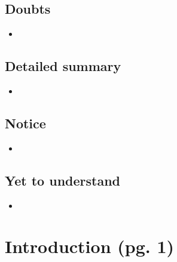 \documentclass{article}
\begin{document}
\subsection{Doubts}

    \begin{itemize}

    \item 
    
    \end{itemize}

\subsection{Detailed summary}

    \begin{itemize}

    \item 
    
    \end{itemize}

\subsection{Notice}

    \begin{itemize}

    \item 
    
    \end{itemize}

\subsection{Yet to understand}

    \begin{itemize}

    \item 
    
    \end{itemize}

\section{Introduction (pg. 1)}
\end{document}
